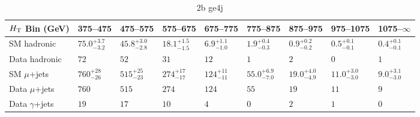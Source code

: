 \documentclass[8pt]{article}
\def\scalht{\mbox{$H_{\rm{T}}$}\xspace}
\newcommand\T{\rule{0pt}{2.6ex}}
\newcommand\B{\rule[-1.2ex]{0pt}{0pt}}
\begin{document}
\begin{table}[ht!]
\caption{2b ge4j}
\label{tab:ensemble-2b ge4j}
\centering
\begin{tabular}{ lllllllll }

\hline
\scalht Bin (GeV)       & 375--475                       & 475--575                       & 575--675                       & 675--775                       & 775--875                       & 875--975                       & 975--1075                      & 1075--$\infty$                 \\ [1.000000ex]
\hline
SM hadronic\T           & $75.0^{+3.7}_{-3.2}$           & $45.8^{+3.0}_{-2.8}$           & $18.1^{+1.5}_{-1.5}$           & $6.9^{+1.1}_{-1.0}$            & $1.9^{+0.4}_{-0.3}$            & $0.9^{+0.2}_{-0.2}$            & $0.5^{+0.1}_{-0.1}$            & $0.4^{+0.1}_{-0.1}$            \\ 
Data hadronic\B         & $72$                           & $52$                           & $31$                           & $12$                           & $1$                            & $2$                            & $0$                            & $1$                            \\ 
\hline
SM $\mu$+jets\T         & $760^{+28}_{-26}$              & $515^{+25}_{-23}$              & $274^{+17}_{-17}$              & $124^{+11}_{-11}$              & $55.0^{+6.9}_{-7.0}$           & $19.0^{+4.0}_{-4.9}$           & $11.0^{+3.0}_{-3.0}$           & $9.0^{+3.1}_{-3.0}$            \\ 
Data $\mu$+jets\B       & $760$                          & $515$                          & $274$                          & $124$                          & $55$                           & $19$                           & $11$                           & $9$                            \\ 
\hline
Data $\gamma$+jets\B    & $19$                           & $17$                           & $10$                           & $4$                            & $0$                            & $2$                            & $1$                            & $0$                            \\ 
\hline

\end{tabular}
\end{table}
\end{document}

